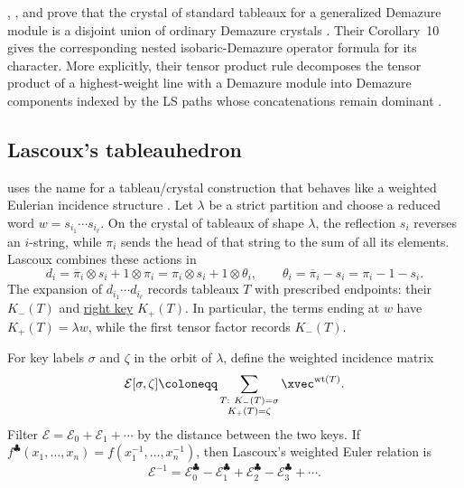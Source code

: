 , , and
 prove that the crystal of standard tableaux for a
generalized Demazure module is a disjoint union of ordinary Demazure crystals
\cite[Thm.~2]{LakshmibaiLittelmannMagyar2002}.  Their Corollary~10 gives the
corresponding nested isobaric-Demazure operator formula for its character.
More explicitly, their tensor product rule decomposes the tensor product of a
highest-weight line with a Demazure module into Demazure components indexed
by the LS paths whose concatenations remain dominant
\cite[Cor.~10, Prop.~12]{LakshmibaiLittelmannMagyar2002}.


\subsection[lascouxTableauhedron]{Lascoux's tableauhedron}

 uses the name 
\label{lascouxTableauhedronDefinition} for a tableau/crystal construction
that behaves like a weighted Eulerian incidence structure
\cite[pp.~13--24]{Lascoux2012Tableauhedron}.
Let $\lambda$ be a strict partition and choose a reduced word
$w=s_{i_1}\dotsm s_{i_\ell}$.  On the crystal of tableaux of shape
$\lambda$, the reflection $s_i$ reverses an $i$-string, while $\pi_i$ sends
the head of that string to the sum of all its elements.  Lascoux combines
these actions in
\[
 d_i=\overline{\pi}_i\otimes s_i+1\otimes\pi_i
    =\pi_i\otimes s_i+1\otimes\theta_i,
 \qquad
 \theta_i=\overline{\pi}_i-s_i=\pi_i-1-s_i.
\]
The expansion of $d_{i_1}\dotsm d_{i_\ell}$ records tableaux $T$ with
prescribed endpoints: their  $K_-(T)$ and
\hyperref[rightKey]{right key} $K_+(T)$.  In particular, the terms ending at
$w$ have $K_+(T)=\lambda w$, while the first tensor factor records
$K_-(T)$.

For key labels $\sigma$ and $\zeta$ in the orbit of $\lambda$, define the
weighted incidence matrix
\[
 \mathcal E[\sigma,\zeta]
   \coloneqq
   \sum_{\substack{T:\ K_-(T)=\sigma\\K_+(T)=\zeta}}
   \xvec^{\operatorname{wt}(T)}.
\]
Filter $\mathcal E=\mathcal E_0+\mathcal E_1+\dotsb$ by the distance between
the two keys.  If
$f^\clubsuit(x_1,\dotsc,x_n)=f(x_1^{-1},\dotsc,x_n^{-1})$, then Lascoux's
weighted Euler relation is \cite[p.~22]{Lascoux2012Tableauhedron}
\[
 \mathcal E^{-1}
 =\mathcal E_0^\clubsuit-\mathcal E_1^\clubsuit
  +\mathcal E_2^\clubsuit-\mathcal E_3^\clubsuit+\dotsb.
\]

